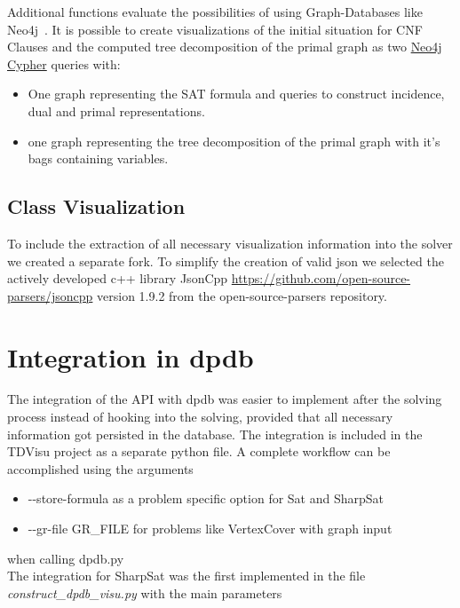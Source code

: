 \documentclass[a4paper, 12pt, bibliography=totoc]{scrartcl}
\begin{document}
Additional functions evaluate the possibilities of using Graph-Databases like Neo4j~\cite{graphdatabases}.
It is possible to create visualizations of the initial situation for CNF Clauses and the computed tree decomposition of the primal graph as two \href{https://neo4j.com/docs/cypher-refcard/current/}{Neo4j Cypher} queries with:
\begin{itemize}
	\item One graph representing the SAT formula and  queries to construct incidence, dual and primal representations.
	\item one graph representing the tree decomposition of the primal graph with it's bags containing variables.
\end{itemize}

\subsection{Class Visualization}

To include the extraction of all necessary visualization information into the solver we created a separate fork.
To simplify the creation of valid json we selected the actively developed c++ library JsonCpp \url{https://github.com/open-source-parsers/jsoncpp} version 1.9.2 from the open-source-parsers repository.

\newpage
\section{Integration in dpdb}\label{sec:dpdb}
The integration of the API with dpdb was easier to implement after the solving process instead of hooking into the solving, 
provided that all necessary information got persisted in the database.
The integration is included in the TDVisu project as a separate python file.
A complete workflow can be accomplished using the arguments
\begin{itemize}
	\item -{}-store-formula as a problem specific option for Sat and SharpSat
	\item -{}-gr-file GR\_FILE for problems like VertexCover with graph input 
\end{itemize}
when calling dpdb.py\\
The integration for SharpSat was the first implemented in the file \textit{construct\_dpdb\_visu.py} with
the main parameters
\end{document}
